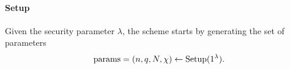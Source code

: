 \documentclass[../main.tex]{subfiles}
\begin{document}
\iffalse 
\paragraph{Setup} Given the security parameter $\lambda$, the scheme starts by generating the set of parameters 
\begin{align*}
    \text{params}=(n,q,N,\chi) \leftarrow \text{Setup}(1^{\lambda}).
\end{align*}

\end{document}
